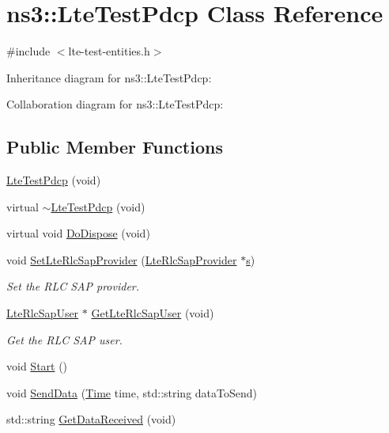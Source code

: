 \hypertarget{classns3_1_1LteTestPdcp}{}\section{ns3\+:\+:Lte\+Test\+Pdcp Class Reference}
\label{classns3_1_1LteTestPdcp}


{\ttfamily \#include $<$lte-\/test-\/entities.\+h$>$}



Inheritance diagram for ns3\+:\+:Lte\+Test\+Pdcp\+:


Collaboration diagram for ns3\+:\+:Lte\+Test\+Pdcp\+:
\subsection*{Public Member Functions}
\begin{DoxyCompactItemize}
\item 
\hyperlink{classns3_1_1LteTestPdcp_af9e0f91a0dd0cc704853792034d812b0}{Lte\+Test\+Pdcp} (void)
\item 
virtual \hyperlink{classns3_1_1LteTestPdcp_a46692538637d3894415fd936e8fa0164}{$\sim$\+Lte\+Test\+Pdcp} (void)
\item 
virtual void \hyperlink{classns3_1_1LteTestPdcp_a92a6cd3ec535a914cd973e642b351733}{Do\+Dispose} (void)
\item 
void \hyperlink{classns3_1_1LteTestPdcp_a47f07d4c2e6e1b06d5d5103c7678cb06}{Set\+Lte\+Rlc\+Sap\+Provider} (\hyperlink{classns3_1_1LteRlcSapProvider}{Lte\+Rlc\+Sap\+Provider} $\ast$\hyperlink{generate__test__data__lte__sinr_8m_ad83eeb3a142285d1243a08c6b7026df8}{s})
\begin{DoxyCompactList}\small\item\em Set the R\+LC S\+AP provider. \end{DoxyCompactList}\item 
\hyperlink{classns3_1_1LteRlcSapUser}{Lte\+Rlc\+Sap\+User} $\ast$ \hyperlink{classns3_1_1LteTestPdcp_a3893283fd40b527e935ae025ac1a813e}{Get\+Lte\+Rlc\+Sap\+User} (void)
\begin{DoxyCompactList}\small\item\em Get the R\+LC S\+AP user. \end{DoxyCompactList}\item 
void \hyperlink{classns3_1_1LteTestPdcp_a8c8632ee0d148f225d8664f0e280c718}{Start} ()
\item 
void \hyperlink{classns3_1_1LteTestPdcp_ae29e8e3bd1b7719af4d524b6ea5aed86}{Send\+Data} (\hyperlink{classns3_1_1Time}{Time} time, std\+::string data\+To\+Send)
\item 
std\+::string \hyperlink{classns3_1_1LteTestPdcp_ad76c1af34c82dcde92a703e210de921a}{Get\+Data\+Received} (void)
\end{DoxyCompactItemize}
